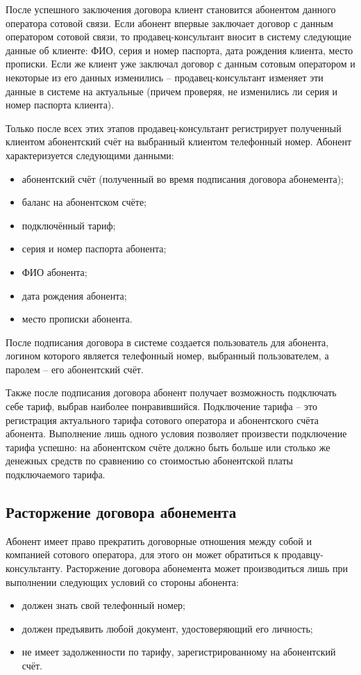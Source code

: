 После успешного заключения договора клиент становится абонентом данного оператора сотовой связи. Если абонент впервые заключает договор с данным оператором сотовой связи, то продавец-консультант вносит в систему следующие данные об клиенте: ФИО, серия и номер паспорта, дата рождения клиента, место прописки. Если же клиент уже заключал договор с данным сотовым оператором и некоторые из его данных изменились -- продавец-консультант изменяет эти данные в системе на актуальные (причем проверяя, не изменились ли серия и номер паспорта клиента).

Только после всех этих этапов продавец-консультант регистрирует полученный клиентом абонентский счёт на выбранный клиентом телефонный номер. Абонент характеризуется следующими данными:
\begin{itemize}
    \item абонентский счёт (полученный во время подписания договора абонемента);
    \item баланс на абонентском счёте;
    \item подключённый тариф;
    \item серия и номер паспорта абонента;
    \item ФИО абонента;
    \item дата рождения абонента;
    \item место прописки абонента.
\end{itemize}

После подписания договора в системе создается пользователь для абонента, логином которого является телефонный номер, выбранный пользователем, а паролем -- его абонентский счёт.

Также после подписания договора абонент получает возможность подключать себе тариф, выбрав наиболее понравившийся. Подключение тарифа -- это регистрация актуального тарифа сотового оператора и абонентского счёта абонента. Выполнение лишь одного условия позволяет произвести подключение тарифа успешно: на абонентском счёте должно быть больше или столько же денежных средств по сравнению со стоимостью абонентской платы подключаемого тарифа.


\subsection{Расторжение договора абонемента}


Абонент имеет право прекратить договорные отношения между собой и компанией сотового оператора, для этого он может обратиться к продавцу-консультанту. Расторжение договора абонемента может производиться лишь при выполнении следующих условий со стороны абонента:
\begin{itemize}
    \item должен знать свой телефонный номер;
    \item должен предъявить любой документ, удостоверяющий его личность;
    \item не имеет задолженности по тарифу, зарегистрированному на абонентский счёт.
\end{itemize} 

